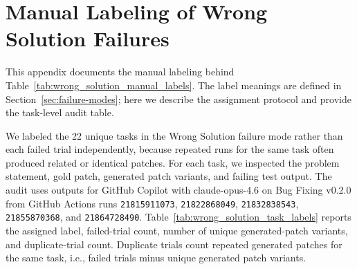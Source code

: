 \documentclass{article}
\begin{document}
\clearpage
\onecolumn
\section{Manual Labeling of Wrong Solution Failures}
\label{app:wrong-solution-audit}

This appendix documents the manual labeling behind Table~\ref{tab:wrong_solution_manual_labels}. The label meanings are defined in Section~\ref{sec:failure-modes}; here we describe the assignment protocol and provide the task-level audit table.

We labeled the 22 unique tasks in the Wrong Solution failure mode rather than each failed trial independently, because repeated runs for the same task often produced related or identical patches. For each task, we inspected the problem statement, gold patch, generated patch variants, and failing test output. The audit uses outputs for GitHub Copilot with claude-opus-4.6 on Bug Fixing v0.2.0 from GitHub Actions runs \texttt{21815911073}, \texttt{21822868049}, \texttt{21832838543}, \texttt{21855870368}, and \texttt{21864728490}. Table~\ref{tab:wrong_solution_task_labels} reports the assigned label, failed-trial count, number of unique generated-patch variants, and duplicate-trial count. Duplicate trials count repeated generated patches for the same task, i.e., failed trials minus unique generated patch variants.
\end{document}
